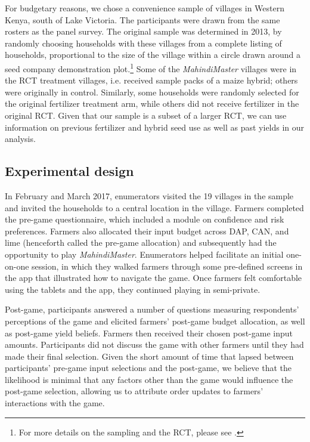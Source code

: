 \documentclass[12pt,letterpaper]{article}
\begin{document}
For budgetary reasons, we chose a convenience sample of villages in Western Kenya, south of Lake Victoria. The participants were drawn from the same rosters as the panel survey. The original sample was determined in 2013, by randomly choosing households with these villages from a complete listing of households, proportional to the size of the village within a circle drawn around a seed company demonstration plot.\footnote{For more details on the sampling and the RCT, please see \cite{niche_carter_2019}.} Some of the \textit{MahindiMaster} villages were in the RCT treatment villages, i.e. received sample packs of a maize hybrid; others were originally in control. Similarly, some households were randomly selected for the original fertilizer treatment arm, while others did not receive fertilizer in the original RCT. Given that our sample is a subset of a larger RCT, we can use information on previous fertilizer and hybrid seed use as well as past yields in our analysis.

\subsection{Experimental design}

In February and March 2017, enumerators visited the 19 villages in the sample and invited the households to a central location in the village. Farmers completed the pre-game questionnaire, which included a module on confidence and risk preferences. Farmers also allocated their input budget across DAP, CAN, and lime (henceforth called the pre-game allocation) and subsequently had the opportunity to play \textit{MahindiMaster}. Enumerators helped facilitate an initial one-on-one session, in which they walked farmers through some pre-defined screens in the app that illustrated how to navigate the game. Once farmers felt comfortable using the tablets and the app, they continued playing in semi-private. 

Post-game, participants answered a number of questions measuring respondents' perceptions of the game and elicited farmers' post-game budget allocation, as well as post-game yield beliefs. Farmers then received their chosen post-game input amounts. Participants did not discuss the game with other farmers until they had made their final selection. Given the short amount of time that lapsed between participants' pre-game input selections and the post-game, we believe that the likelihood is minimal that any factors other than the game would influence the post-game selection, allowing us to attribute order updates to farmers' interactions with the game.
\end{document}
